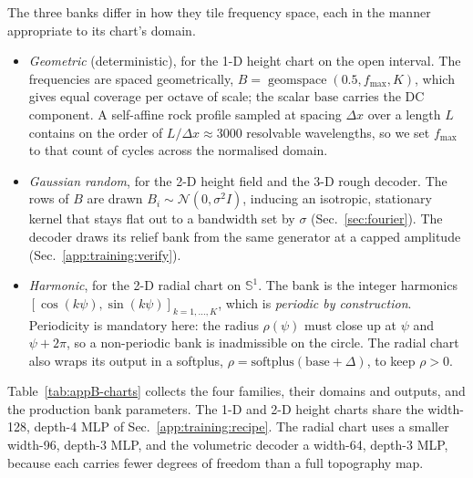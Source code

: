 \documentclass{svjour3}                 %
\newcommand{\Sph}{\mathbb{S}}
\begin{document}
\begin{appendix}
The three banks differ in how they tile frequency space, each in the manner appropriate to its chart's domain.

\begin{itemize}
\item \emph{Geometric} (deterministic), for the 1-D height chart on the open interval. The frequencies are spaced geometrically, $B=\operatorname{geomspace}(0.5,f_{\max},K)$, which gives equal coverage per octave of scale; the scalar $\mathrm{base}$ carries the DC component. A self-affine rock profile sampled at spacing $\Delta x$ over a length $L$ contains on the order of $L/\Delta x\approx 3000$ resolvable wavelengths, so we set $f_{\max}$ to that count of cycles across the normalised domain.
\item \emph{Gaussian random}, for the 2-D height field and the 3-D rough decoder. The rows of $B$ are drawn $B_i\sim\mathcal N(0,\sigma^2 I)$, inducing an isotropic, stationary kernel that stays flat out to a bandwidth set by $\sigma$ (Sec.~\ref{sec:fourier}). The decoder draws its relief bank from the same generator at a capped amplitude (Sec.~\ref{app:training:verify}).
\item \emph{Harmonic}, for the 2-D radial chart on $\Sph^1$. The bank is the integer harmonics $[\cos(k\psi),\sin(k\psi)]_{k=1,\dots,K}$, which is \emph{periodic by construction}. Periodicity is mandatory here: the radius $\rho(\psi)$ must close up at $\psi$ and $\psi+2\pi$, so a non-periodic bank is inadmissible on the circle. The radial chart also wraps its output in a softplus, $\rho=\mathrm{softplus}(\mathrm{base}+\Delta)$, to keep $\rho>0$.
\end{itemize}

Table~\ref{tab:appB-charts} collects the four families, their domains and outputs, and the production bank parameters. The 1-D and 2-D height charts share the width-128, depth-4 MLP of Sec.~\ref{app:training:recipe}. The radial chart uses a smaller width-96, depth-3 MLP, and the volumetric decoder a width-64, depth-3 MLP, because each carries fewer degrees of freedom than a full topography map.


\end{appendix}
\end{document}
